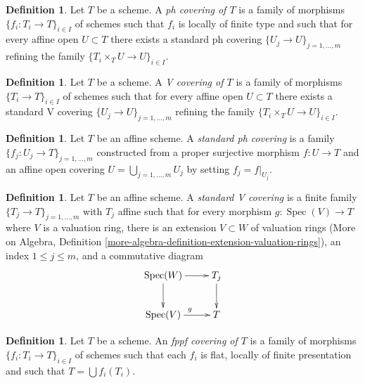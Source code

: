 \documentclass{amsart}
\theoremstyle{plain}
\theoremstyle{definition}
\newtheorem{definition}[subsection]{Definition}
\theoremstyle{remark}
\numberwithin{equation}{subsection}
\def\Spec{\mathop{\mathrm{Spec}}}
\begin{document}
\begin{definition}
\label{topologies-definition-ph-covering}
Let $T$ be a scheme. A {\it ph covering of $T$} is a family
of morphisms $\{f_i : T_i \to T\}_{i \in I}$ of schemes such
that $f_i$ is locally of finite type and such that for every
affine open $U \subset T$ there exists a standard ph covering
$\{U_j \to U\}_{j = 1, \ldots, m}$ refining the family
$\{T_i \times_T U \to U\}_{i \in I}$.
\end{definition}

\begin{definition}
\label{topologies-definition-V-covering}
Let $T$ be a scheme. A {\it V covering of $T$} is a family
of morphisms $\{T_i \to T\}_{i \in I}$ of schemes such that for every
affine open $U \subset T$ there exists a standard V covering
$\{U_j \to U\}_{j = 1, \ldots, m}$ refining the family
$\{T_i \times_T U \to U\}_{i \in I}$.
\end{definition}

\begin{definition}
\label{topologies-definition-standard-ph-covering}
Let $T$ be an affine scheme. A {\it standard ph covering} is a family
$\{f_j : U_j \to T\}_{j = 1, \ldots, m}$ constructed from a
proper surjective morphism $f : U \to T$ and an affine open covering
$U = \bigcup_{j = 1, \ldots, m} U_j$ by setting $f_j = f|_{U_j}$.
\end{definition}

\begin{definition}
\label{topologies-definition-standard-V-covering}
Let $T$ be an affine scheme. A {\it standard V covering} is a finite family
$\{T_j \to T\}_{j = 1, \ldots, m}$ with $T_j$ affine
such that for every morphism $g : \Spec(V) \to T$ where $V$
is a valuation ring, there is an extension $V \subset W$ of valuation rings
(More on Algebra, Definition
\ref{more-algebra-definition-extension-valuation-rings}),
an index $1 \leq j \leq m$, and a commutative diagram
$$
\xymatrix{
\Spec(W) \ar[r] \ar[d] & T_j \ar[d] \\
\Spec(V) \ar[r]^g & T
}
$$
\end{definition}

\begin{definition}
\label{topologies-definition-fppf-covering}
Let $T$ be a scheme. An {\it fppf covering of $T$} is a family
of morphisms $\{f_i : T_i \to T\}_{i \in I}$ of schemes
such that each $f_i$ is flat, locally of finite presentation and such
that $T = \bigcup f_i(T_i)$.
\end{definition}
\end{document}
